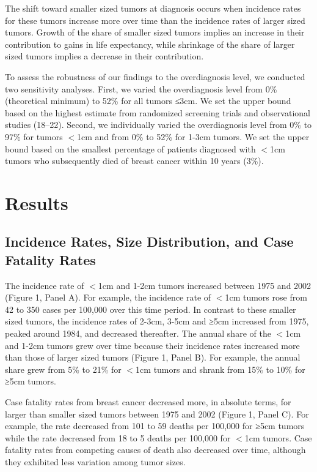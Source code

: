 \documentclass[11pt,letterpaper]{article}
\theoremstyle{plain}
\theoremstyle{remark}
\numberwithin{equation}{section}
\begin{document}
The shift toward smaller sized tumors at diagnosis occurs when
incidence rates for these tumors increase more over time than the
incidence rates of larger sized tumors.  Growth of the share of
smaller sized tumors implies an increase in their contribution to
gains in life expectancy, while shrinkage of the share of larger sized
tumors implies a decrease in their contribution. 

To assess the robustness of our findings to the overdiagnosis level,
we conducted two sensitivity analyses.  First, we varied the
overdiagnosis level from 0\% (theoretical minimum) to 52\% for all
tumors ≤3cm.  We set the upper bound based on the highest estimate
from randomized screening trials and observational studies (18–22).
Second, we individually varied the overdiagnosis level from 0\% to
97\% for tumors $<$1cm and from 0\% to 52\% for 1-3cm tumors.  We set
the upper bound based on the smallest percentage of patients diagnosed
with $<$1cm tumors who subsequently died of breast cancer within 10
years (3\%).

\section{Results}
\subsection{Incidence Rates, Size Distribution, and Case Fatality Rates}
The incidence rate of $<$1cm and 1-2cm tumors increased between 1975 and
2002 (Figure 1, Panel A).  For example, the incidence rate of $<$1cm
tumors rose from 42 to 350 cases per 100,000 over this time period.
In contrast to these smaller sized tumors, the incidence rates of
2-3cm, 3-5cm and ≥5cm increased from 1975, peaked around 1984, and
decreased thereafter.  The annual share of the $<$1cm and 1-2cm tumors
grew over time because their incidence rates increased more than those
of larger sized tumors (Figure 1, Panel B). For example, the annual
share grew from 5\% to 21\% for $<$1cm tumors and shrank from 15\% to
10\% for ≥5cm tumors.

Case fatality rates from breast cancer decreased more, in absolute
terms, for larger than smaller sized tumors between 1975 and 2002
(Figure 1, Panel C).  For example, the rate decreased from 101 to 59
deaths per 100,000 for ≥5cm tumors while the rate decreased from 18 to
5 deaths per 100,000 for $<$1cm tumors.  Case fatality rates from
competing causes of death also decreased over time, although they
exhibited less variation among tumor sizes.
\end{document}
